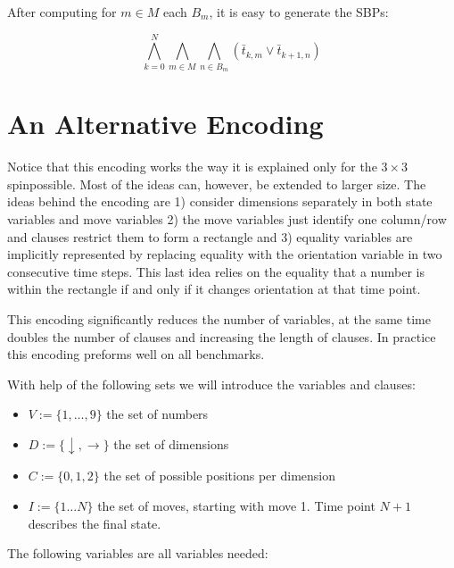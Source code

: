 \documentclass[]{llncs}
\newcommand{\TODO}[1]{ {\color{red}{TODO: #1} }}
\begin{document}
After computing for $m \in M$ each $B_m$, it is easy to generate the SBPs:

\begin{equation}
\bigwedge_{k=0}^{N} \bigwedge_{m \in M} \bigwedge_{n \in B_m} (\bar t_{k,m} \lor \bar t_{k+1,n}) 
\end{equation}

\TODO{Add further ideas of symmetry breaking}


\section{An Alternative Encoding}

Notice that this encoding works the way it is explained only for the $3\times 3$ spinpossible. Most of the ideas can,
however, be extended to larger size. The ideas behind the encoding are 1) consider dimensions separately in both state
variables and move variables 2) the move variables just identify one column/row and clauses restrict them to form a
rectangle and 3) equality variables are implicitly represented by replacing equality with the orientation variable in
two consecutive time steps. This last idea relies on the equality that a number is within the rectangle if and only if
it changes orientation at that time point. 

This encoding significantly reduces the number of variables, at the same time doubles the number of clauses and
increasing the length of clauses. In practice this encoding  preforms well on all benchmarks.

With help of the following sets we will introduce the variables and clauses:

\begin{itemize}
\item $V := \{1,\dots,9\}$ the set of numbers
\item $D := \{\downarrow,\rightarrow\} $ the set of dimensions
\item $C := \{0,1,2\}$ the set of possible positions per dimension
\item $I := \{1\ldots N\}$ the set  of moves, starting with move 1. Time point $N+1$ describes the final state. 
\end{itemize}

The following variables are all variables needed:
\end{document}
